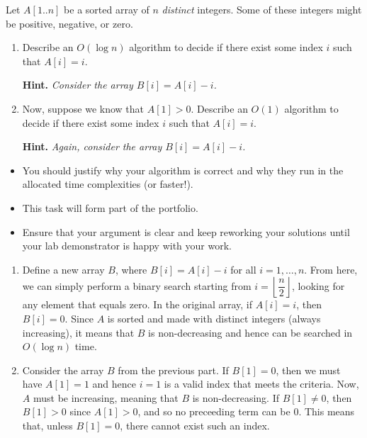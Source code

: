 \documentclass{article}
\begin{document}
\begin{question}
Let $A[1..n]$ be a sorted array of $n$ {\em distinct} integers. Some of these integers might be positive, negative, or zero.
\begin{enumerate}[label = (\alph*)]
    \item Describe an $O(\log n)$ algorithm to decide if there exist some index $i$ such that $A[i] = i$.

    {\bfseries Hint.} {\em Consider the array $B[i] = A[i] - i$.}

    \item Now, suppose we know that $A[1] > 0$. Describe an $O(1)$ algorithm to decide if there exist some index $i$ such that $A[i] = i$.

    {\bfseries Hint.} {\em Again, consider the array $B[i] = A[i] - i$.}
\end{enumerate}
\end{question}

\begin{rubric}
\begin{itemize}
    \item You should justify why your algorithm is correct and why they run in the allocated time complexities (or faster!).

    \item This task will form part of the portfolio.
    \item Ensure that your argument is clear and keep reworking your solutions until your lab demonstrator is happy with your work.
\end{itemize}
\end{rubric}

\begin{solution}
\begin{enumerate}[label = (\alph*)]
    \item Define a new array $B$, where $B[i] = A[i] - i$ for all $i = 1, \dots, n$. From here, we can simply perform a binary search starting from $\displaystyle i = \left \lfloor \dfrac{n}{2}  \right \rfloor$, looking for any element that equals zero. In the original array, if $A[i] = i$, then $B[i] = 0$. Since $A$ is sorted and made with distinct integers (always increasing), it means that $B$ is non-decreasing and hence can be searched in $O(\log n)$ time.

    \item Consider the array $B$ from the previous part. If $B[1] = 0$, then we must have $A[1] = 1$ and hence $i = 1$ is a valid index that meets the criteria. Now, $A$ must be increasing, meaning that $B$ is non-decreasing. If $B[1] \neq 0$, then $B[1] > 0$ since $A[1] > 0$, and so no preceeding term can be $0$. This means that, unless $B[1] = 0$, there cannot exist such an index.
\end{enumerate}
\end{solution}
\end{document}
